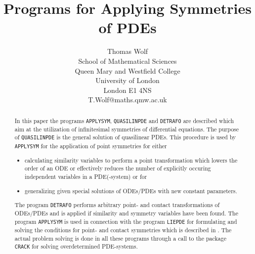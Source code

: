 
\oddsidemargin 10mm  \evensidemargin 10mm
\topmargin 0pt   \headheight 0pt   \headsep 0pt
\footheight 14pt  \footskip 40pt
\textheight 23cm  \textwidth 15cm




\title{Programs for Applying Symmetries of PDEs}
\author{Thomas Wolf \\
        School of Mathematical Sciences \\
        Queen Mary and Westfield College \\
        University of London \\
        London E1 4NS \\
        T.Wolf@maths.qmw.ac.uk
}


\maketitle
\begin{abstract}
In this paper the programs {\tt APPLYSYM}, {\tt QUASILINPDE} and
{\tt DETRAFO} are described which aim at the utilization
of infinitesimal symmetries of differential equations. The purpose
of {\tt QUASILINPDE} is the general solution of
quasilinear PDEs. This procedure is used by {\tt APPLYSYM}
for the application of point symmetries for either
\begin{itemize}
\item calculating similarity variables to perform a point transformation
which lowers the order of an ODE or effectively reduces the number of
explicitly occuring independent variables in a PDE(-system) or for
\item generalizing given special solutions of ODEs/PDEs with new constant
parameters.
\end{itemize}

The program {\tt DETRAFO} performs arbitrary point- and contact
transformations of ODEs/PDEs and is applied if similarity
and symmetry variables have been found.
The program {\tt APPLYSYM} is used in connection with the program
{\tt LIEPDE} for formulating and solving the conditions for point- and
contact symmetries which is described in \cite{LIEPDE}.
The actual problem solving is done in all these programs through a call
to the package {\tt CRACK} for solving overdetermined PDE-systems.
\end{abstract}

